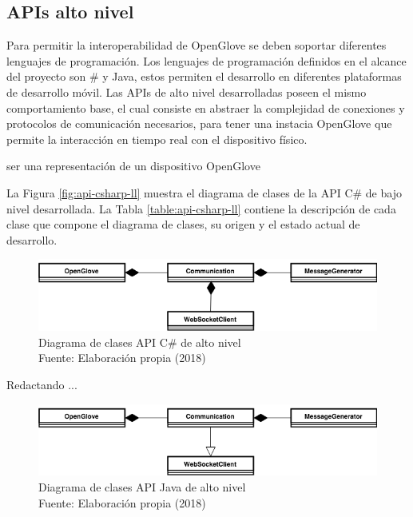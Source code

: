 \subsection{APIs alto nivel}
Para permitir la interoperabilidad de OpenGlove se deben soportar diferentes lenguajes de programación. Los lenguajes de programación definidos en el alcance del proyecto son \C# y Java, estos permiten el desarrollo en diferentes plataformas de desarrollo móvil. Las APIs de alto nivel desarrolladas poseen el mismo comportamiento base, el cual consiste en abstraer la complejidad de conexiones y protocolos de comunicación necesarios, para tener una instacia OpenGlove que permite la interacción en tiempo real con el dispositivo físico.

ser una representación de un dispositivo OpenGlove

La Figura \ref{fig:api-csharp-ll} muestra el diagrama de clases de la API C\# de bajo nivel  desarrollada.  La Tabla \ref{table:api-csharp-ll} contiene la descripción de cada clase que compone el diagrama de clases, su origen y el estado actual de desarrollo.


\begin{figure}[H]
  \begin{center} 
   	\includegraphics[width=1.0\textwidth]{images/chapter04/OpenGlove-Architecture-API-CSharp-HL.png} 
    \caption[Diagrama de clases API C\# de alto nivel]{Diagrama de clases API C\# de alto nivel \\Fuente: Elaboración propia (2018)}
    \label{fig:api-csharp-hl}
  \end{center}
\end{figure}


Redactando ...

\begin{figure}[H]
  \begin{center} 
   	\includegraphics[width=1.0\textwidth]{images/chapter04/OpenGlove-Architecture-API-Java-HL.png} 
    \caption[Diagrama de clases API Java de alto nivel]{Diagrama de clases API Java de alto nivel \\Fuente: Elaboración propia (2018)}
    \label{fig:api-java-hl}
  \end{center}
\end{figure}

